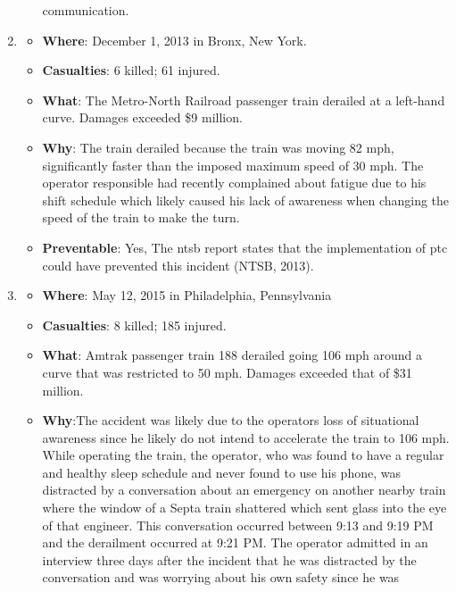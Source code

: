 \documentclass[11pt, titlepage]{article}
\begin{document}
\begin{enumerate}
\begin{itemize}
        communication.
    \end{itemize}
    \item
    \begin{itemize}
        \item \textbf{Where}: December 1, 2013 in Bronx, New York.
        \item \textbf{Casualties}: 6 killed; 61 injured.
        \item \textbf{What}: The Metro-North Railroad passenger train derailed at
        a left-hand curve. Damages exceeded \$9 million.
        \item \textbf{Why}: The train derailed because the train was moving 82
        mph, significantly faster than the imposed maximum speed of 30 mph. The
        operator responsible had recently complained about fatigue due to his
        shift schedule which likely caused his lack of awareness when changing
        the speed of the train to make the turn.
        \item \textbf{Preventable}: Yes, The \gls{ntsb} report states that the
        implementation of \gls{ptc} could have prevented this incident (NTSB,
        2013).
    \end{itemize}
    \item
    \begin{itemize}
        \item \textbf{Where}: May 12, 2015 in Philadelphia, Pennsylvania
        \item \textbf{Casualties}: 8 killed; 185 injured.
        \item \textbf{What}: Amtrak passenger train 188 derailed going 106 mph
        around a curve that was restricted to 50 mph. Damages exceeded that of
        \$31 million.
        \item \textbf{Why}:The accident was likely due to the operators loss of
        situational awareness since he likely do not intend to accelerate the
        train to 106 mph. While operating the train, the operator, who was found
        to have a regular and healthy sleep schedule and never found to use his
        phone, was distracted by a conversation about an emergency on another
        nearby train where the window of a Septa train shattered which sent glass
        into the eye of that engineer. This conversation occurred between 9:13
        and 9:19 PM and the derailment occurred at 9:21 PM. The operator admitted
        in an interview three days after the incident that he was distracted by
        the conversation and was worrying about his own safety since he was

\end{itemize}
\end{enumerate}
\end{document}
